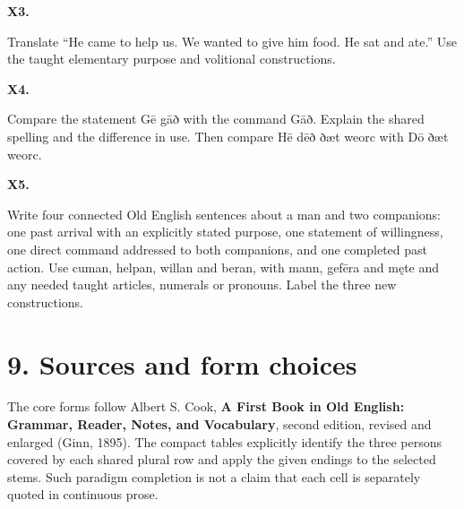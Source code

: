 \par\begin{minipage}{\linewidth}\raggedright
\textbf{X3.}

Translate “He came to help us. We wanted to give him food. He sat and ate.” Use the taught elementary purpose and volitional constructions.

\end{minipage}\par\addvspace{4pt}

\par\begin{minipage}{\linewidth}\raggedright
\textbf{X4.}

Compare the statement Gē gāð with the command Gāð. Explain the shared spelling and the difference in use. Then compare Hē dēð ðæt weorc with Dō ðæt weorc.

\end{minipage}\par\addvspace{4pt}

\par\begin{minipage}{\linewidth}\raggedright
\textbf{X5.}

Write four connected Old English sentences about a man and two companions: one past arrival with an explicitly stated purpose, one statement of willingness, one direct command addressed to both companions, and one completed past action. Use cuman, helpan, willan and beran, with mann, gefēra and męte and any needed taught articles, numerals or pronouns. Label the three new constructions.

\end{minipage}\par\addvspace{4pt}

\clearpage
\section*{9. Sources and form choices}

\begingroup\fontsize{10}{12.8}\selectfont
\setlength{\parskip}{1.5pt}
The core forms follow Albert S. Cook, \textbf{A First Book in Old English: Grammar, Reader, Notes, and Vocabulary}, second edition, revised and enlarged (Ginn, 1895). The compact tables explicitly identify the three persons covered by each shared plural row and apply the given endings to the selected stems. Such paradigm completion is not a claim that each cell is separately quoted in continuous prose.

